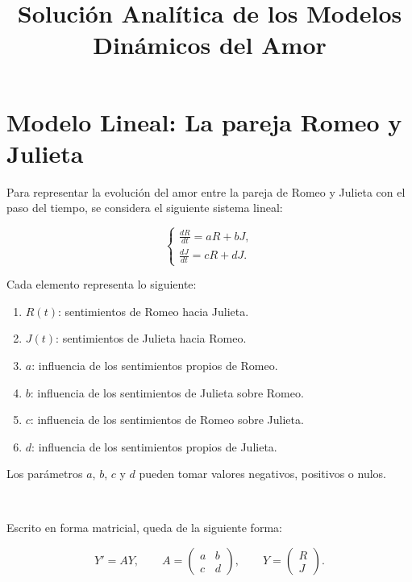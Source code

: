 \documentclass[10pt]{article}
\title{Solución Analítica de los Modelos Dinámicos del Amor}
\author{}
\date{}
\numberwithin{equation}{section}
\begin{document}
\maketitle

\section{Modelo Lineal: La pareja Romeo y Julieta}

Para representar la evolución del amor entre la pareja de Romeo y Julieta con el paso del tiempo, se considera
el siguiente sistema lineal:

\begin{equation}
\begin{cases}
\frac{dR}{dt} = aR + bJ,\\
\frac{dJ}{dt} = cR + dJ.
\end{cases}
\end{equation}

Cada elemento representa lo siguiente:
	\begin{enumerate}[label=-]
	\item $R(t)$: sentimientos de Romeo hacia Julieta.
	\item $J(t)$: sentimientos de Julieta hacia Romeo.
	\item $a$: influencia de los sentimientos propios de Romeo.
	\item $b$: influencia de los sentimientos de Julieta sobre Romeo.
	\item $c$: influencia de los sentimientos de Romeo sobre Julieta.
	\item $d$: influencia de los sentimientos propios de Julieta.
	\end{enumerate}

Los parámetros $a$, $b$, $c$ y $d$ pueden tomar valores negativos, positivos o nulos.

$ $

Escrito en forma matricial, queda de la siguiente forma:

\begin{equation}
Y'=AY,
\qquad
A=
\begin{pmatrix}
a & b\\
c & d
\end{pmatrix},
\qquad
Y=
\begin{pmatrix}
R\\
J
\end{pmatrix}.
\end{equation}
\end{document}
